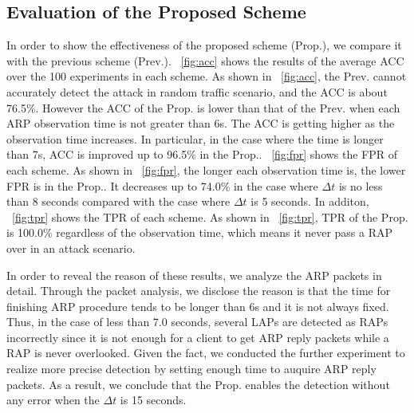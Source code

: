 \documentclass[conference]{IEEEtran}
\begin{document}
\subsection{Evaluation of the Proposed Scheme}
In order to show the effectiveness of the proposed scheme (Prop.), we compare it with the previous scheme \cite{previous} (Prev.).
\figurename~\ref{fig:acc} shows the results of the average ACC over the 100 experiments in each scheme.
As shown in \figurename~\ref{fig:acc}, the Prev. cannot accurately detect the attack in random traffic scenario, and the ACC is about 76.5\%.
However the ACC of the Prop. is lower than that of the Prev. when each ARP observation time is not greater than 6s.
The ACC is getting higher as the observation time increases.
In particular, in the case where the time is longer than 7s, ACC is improved up to 96.5\% in the Prop..
\figurename~\ref{fig:fpr} shows the FPR of each scheme.
As shown in \figurename~\ref{fig:fpr}, the longer each observation time is, the lower FPR is in the Prop..
It decreases up to 74.0\% in the case where $\Delta t$ is no less than 8 seconds compared with the case where $\Delta t$ is 5 seconds.
In additon, \figurename~\ref{fig:tpr} shows the TPR of each scheme.
As shown in \figurename~\ref{fig:tpr}, TPR of the Prop. is 100.0\% regardless of the observation time, which means it never pass a RAP over in an attack scenario.

In order to reveal the reason of these results, we analyze the ARP packets in detail.
Through the packet analysis, we disclose the reason is that the time for finishing ARP procedure tends to be longer than 6s and it is not always fixed.
Thus, in the case of less than 7.0 seconds, several LAPs are detected as RAPs incorrectly since it is not enough for a client to get ARP reply packets while a RAP is never overlooked.
Given the fact, we conducted the further experiment to realize more precise detection by setting enough time to auquire ARP reply packets.
As a result, we conclude that the Prop. enables the detection without any error when the $\Delta t$ is 15 seconds.
\end{document}
